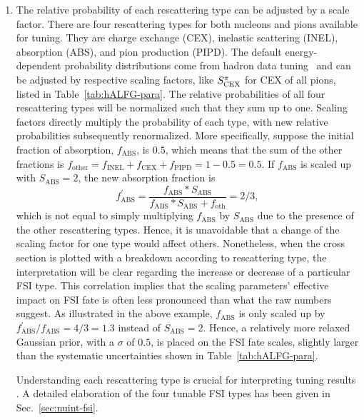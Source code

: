 \begin{enumerate}
    \item 
    The relative probability of each rescattering type can be adjusted by a scale factor. There are four rescattering types for both nucleons and pions available for tuning. They are charge exchange (CEX), inelastic scattering (INEL), absorption (ABS), and pion production (PIPD). The default energy-dependent probability distributions come from hadron data tuning~\cite{LADS:1999dyv,Navon:1983xj,Carroll:1976hj,Clough:1974qt,BAUHOFF1986429} and can be adjusted by respective scaling factors, like $S_\textrm{CEX}^{\pi}$ for CEX of all pions, listed in Table~\ref{tab:hALFG-para}. The relative probabilities of all four rescattering types will be normalized such that they sum up to one. Scaling factors directly multiply  the probability of each type, with new relative probabilities subsequently renormalized. More specifically, suppose the initial fraction of absorption, $f_\textrm{ABS}$, is $0.5$, which means that the sum of the other fractions is  $f_\textrm{other}=f_\textrm{INEL}+f_\textrm{CEX}+f_\textrm{PIPD}=1-0.5=0.5$. If $f_\textrm{ABS}$ is scaled up with $S_\textrm{ABS}=2$, the new absorption fraction is 
    \begin{equation}
        f^\prime_\textrm{ABS} = \frac{f_\textrm{ABS}*S_\textrm{ABS}}{f_\textrm{ABS}*S_\textrm{ABS}+f_\textrm{oth}} = 2/3,
    \end{equation}
    which is not equal to simply multiplying $f_\textrm{ABS}$ by $S_\textrm{ABS}$ due to the presence of the other rescattering types. Hence, it is unavoidable that a change of the scaling factor for one type would affect others. Nonetheless, when the cross section is plotted with a breakdown according to rescattering type, the interpretation will be clear regarding the increase or decrease of a particular FSI type. This correlation implies that the scaling parameters' effective impact on FSI fate is often less pronounced than what the raw numbers suggest. As illustrated in the above example, $f_\textrm{ABS}$ is only scaled up by $ f^\prime_\textrm{ABS}/f_\textrm{ABS}=4/3=1.3$ instead of $S_\textrm{ABS}=2$. Hence, a relatively more relaxed Gaussian prior, with a $\sigma$ of $0.5$, is placed on the FSI fate scales, slightly larger than the systematic uncertainties shown in Table~\ref{tab:hALFG-para}. 

    Understanding each rescattering type is crucial for interpreting tuning results
    .
    A detailed elaboration of the four tunable FSI types has been given in Sec.~\ref{sec:nuint-fsi}. 

\end{enumerate}

